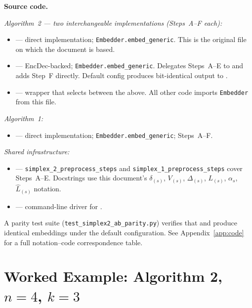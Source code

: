\begin{tcolorbox}[keybox]
\textbf{Source code.}

\smallskip
\noindent\textit{Algorithm~2 — two interchangeable implementations (Steps~A--F each):}
\begin{itemize}[nosep,leftmargin=1.5em,topsep=2pt]
  \item \algtwoapy{} — direct implementation; \texttt{Embedder.embed\_generic}.
    This is the original file on which the document is based.
  \item \algtwobpy{} — EncDec-backed; \texttt{Embedder.embed\_generic}.
    Delegates Steps~A--E to \encdecpy{} and adds Step~F directly.
    Default config produces bit-identical output to \algtwoapy{}.
  \item \algtwopy{} — wrapper that selects between the above.
    All other code imports \texttt{Embedder} from this file.
\end{itemize}

\smallskip
\noindent\textit{Algorithm~1:}
\begin{itemize}[nosep,leftmargin=1.5em,topsep=2pt]
  \item \algonepy{} — direct implementation; \texttt{Embedder.embed\_generic}; Steps~A--F.
\end{itemize}

\smallskip
\noindent\textit{Shared infrastructure:}
\begin{itemize}[nosep,leftmargin=1.5em,topsep=2pt]
  \item \encdecpy{} — \texttt{simplex\_2\_preprocess\_steps} and
    \texttt{simplex\_1\_preprocess\_steps} cover Steps~A--E.
    Docstrings use this document's $\delta_{(s)}$, $V_{(s)}$, $\Delta_{(s)}$,
    $L_{(s)}$, $\alpha_s$, $\hat{L}_{(s)}$ notation.
  \item \playpy{} — command-line driver for \encdecpy{}.
\end{itemize}

\smallskip
\noindent A parity test suite
(\texttt{test\_simplex2\_ab\_parity.py}) verifies that \algtwoapy{} and
\algtwobpy{} produce identical embeddings under the default configuration.
See Appendix~\ref{app:code} for a full notation--code correspondence table.
\end{tcolorbox}

\section{Worked Example: Algorithm 2, $n=4$, $k=3$}
\label{sec:example-alg2}


